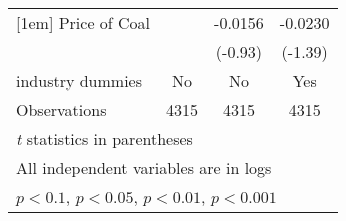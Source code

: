 \begin{table}[htbp]
\begin{tabular}{l*{3}{c}}
[1em]
Price of Coal       &                     &     -0.0156         &     -0.0230         \\
                    &                     &     (-0.93)         &     (-1.39)         \\
[1em]
industry dummies    &          No         &          No         &         Yes         \\
\hline
Observations        &        4315         &        4315         &        4315         \\
\hline\hline
\multicolumn{4}{l}{\footnotesize \textit{t} statistics in parentheses}\\
\multicolumn{4}{l}{\footnotesize All independent variables are in logs}\\
\multicolumn{4}{l}{\footnotesize \sym{+} \(p<0.1\), \sym{*} \(p<0.05\), \sym{**} \(p<0.01\), \sym{***} \(p<0.001\)}\\
\end{tabular}
\end{table}
